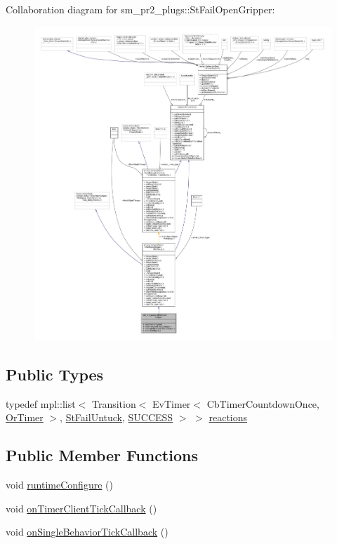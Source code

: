 Collaboration diagram for sm\+\_\+pr2\+\_\+plugs\+:\+:St\+Fail\+Open\+Gripper\+:
\nopagebreak
\begin{figure}[H]
\begin{center}
\leavevmode
\includegraphics[width=350pt]{structsm__pr2__plugs_1_1StFailOpenGripper__coll__graph}
\end{center}
\end{figure}
\subsection*{Public Types}
\begin{DoxyCompactItemize}
\item 
typedef mpl\+::list$<$ Transition$<$ Ev\+Timer$<$ Cb\+Timer\+Countdown\+Once, \hyperlink{classsm__pr2__plugs_1_1OrTimer}{Or\+Timer} $>$, \hyperlink{structsm__pr2__plugs_1_1StFailUntuck}{St\+Fail\+Untuck}, \hyperlink{classSUCCESS}{S\+U\+C\+C\+E\+SS} $>$ $>$ \hyperlink{structsm__pr2__plugs_1_1StFailOpenGripper_a64622a0c63bb5c86b60552ba92437e91}{reactions}
\end{DoxyCompactItemize}
\subsection*{Public Member Functions}
\begin{DoxyCompactItemize}
\item 
void \hyperlink{structsm__pr2__plugs_1_1StFailOpenGripper_a9972024358d52891ff6ff0282f1abfba}{runtime\+Configure} ()
\item 
void \hyperlink{structsm__pr2__plugs_1_1StFailOpenGripper_a61f887a4b8a6884466df6bdf96af3936}{on\+Timer\+Client\+Tick\+Callback} ()
\item 
void \hyperlink{structsm__pr2__plugs_1_1StFailOpenGripper_a93912d044e4fe53795fc07174ae3f830}{on\+Single\+Behavior\+Tick\+Callback} ()
\end{DoxyCompactItemize}
